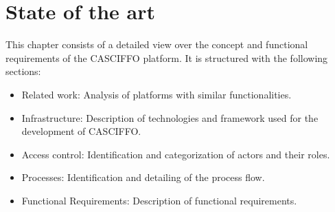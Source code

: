 \setlength{\headheight}{14.49998pt}
\chapter{State of the art}\label{ch:functionalities}

This chapter consists of a detailed view over the concept and functional requirements of the CASCIFFO platform.
It is structured with the following sections:
\begin{itemize}
    \item Related work: Analysis of platforms with similar functionalities.
    \item Infrastructure: Description of technologies and framework used for the development of CASCIFFO. 
    \item Access control: Identification and categorization of actors and their roles.
    \item Processes: Identification and detailing of the process flow.
    \item Functional Requirements: Description of functional requirements.
\end{itemize}

